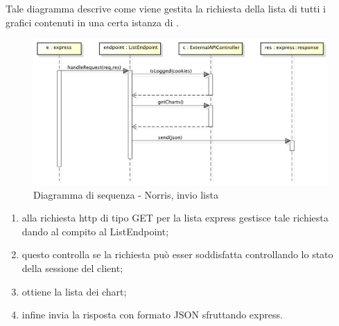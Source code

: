             
        	Tale diagramma descrive come viene gestita la richiesta della lista di tutti i grafici contenuti in una certa istanza di .
            \begin{figure}[H]
                \centering
                \includegraphics[scale=0.3]{DefinizioneDiProdotto/Pics/NorrisInvioLista}
                \caption{Diagramma di sequenza - Norris, invio lista}
            \end{figure}
            \begin{enumerate}
                \item alla richiesta http di tipo GET per la lista express gestisce tale richiesta dando al compito al ListEndpoint;
                \item questo controlla se la richiesta può esser soddisfatta controllando lo stato della sessione del client;
                \item ottiene la lista dei chart;
                \item infine invia la risposta con formato JSON sfruttando express.
            \end{enumerate}

